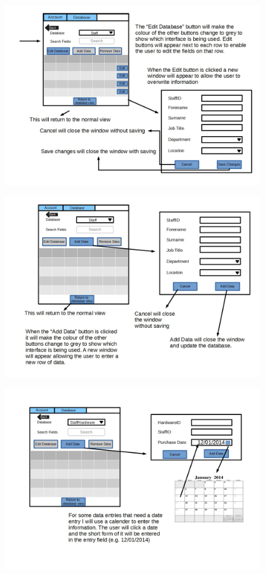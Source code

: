 \begin{figure}[H]
\includegraphics[width=\textwidth]{GUI_Design11.jpg}
\caption{}
\end{figure}

\begin{figure}[H]
\includegraphics[width=\textwidth]{GUI_Design12.jpg}
\caption{}
\end{figure}

\begin{figure}[H]
\includegraphics[width=\textwidth]{GUI_Design13.jpg}
\caption{}
\end{figure}

